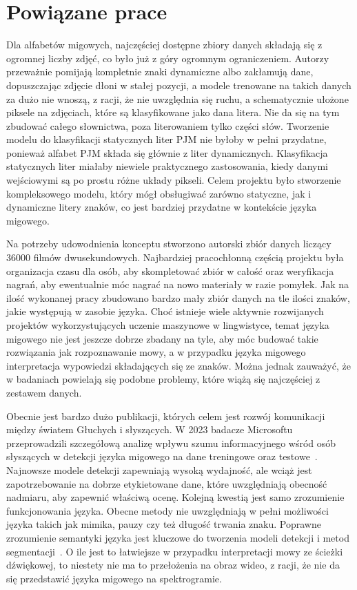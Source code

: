 \section{Powiązane prace}
\label{sec:related-works}

Dla alfabetów migowych, najczęściej dostępne zbiory danych składają się z ogromnej liczby zdjęć, co było już z góry ogromnym ograniczeniem. Autorzy przeważnie pomijają kompletnie znaki dynamiczne albo zakłamują dane, dopuszczając zdjęcie dłoni w stałej pozycji, a modele trenowane na takich danych za dużo nie wnoszą, z racji, że nie uwzględnia się ruchu, a schematycznie ułożone piksele na zdjęciach, które są klasyfikowane jako dana litera. Nie da się na tym zbudować całego słownictwa, poza literowaniem tylko części słów. Tworzenie modelu do klasyfikacji statycznych liter PJM nie byłoby w pełni przydatne, ponieważ alfabet PJM składa się głównie z liter dynamicznych. Klasyfikacja statycznych liter miałaby niewiele praktycznego zastosowania, kiedy danymi wejściowymi są po prostu różne układy pikseli. Celem projektu było stworzenie kompleksowego modelu, który mógł obsługiwać zarówno statyczne, jak i dynamiczne litery znaków, co jest bardziej przydatne w kontekście języka migowego.

Na potrzeby udowodnienia konceptu stworzono autorski zbiór danych liczący 36000 filmów dwusekundowych. Najbardziej pracochłonną częścią projektu była organizacja czasu dla osób, aby skompletować zbiór w całość oraz weryfikacja nagrań, aby ewentualnie móc nagrać na nowo materiały w razie pomyłek. Jak na ilość wykonanej pracy zbudowano bardzo mały zbiór danych na tle ilości znaków, jakie występują w zasobie języka. Choć istnieje wiele aktywnie rozwijanych projektów wykorzystujących uczenie maszynowe w lingwistyce, temat języka migowego nie jest jeszcze dobrze zbadany na tyle, aby móc budować takie rozwiązania jak rozpoznawanie mowy, a w przypadku języka migowego interpretacja wypowiedzi składających się ze znaków. Można jednak zauważyć, że w badaniach powielają się podobne problemy, które wiążą się najczęściej z zestawem danych.

Obecnie jest bardzo dużo publikacji, których celem jest rozwój komunikacji między światem Głuchych i słyszących. W 2023 badacze Microsoftu przeprowadzili szczegółową analizę wpływu szumu informacyjnego wśród osób słyszących w detekcji języka migowego na dane treningowe oraz testowe~\cite{pal2023}. Najnowsze modele detekcji zapewniają wysoką wydajność, ale wciąż jest zapotrzebowanie na dobrze etykietowane dane, które uwzględniają obecność nadmiaru, aby zapewnić właściwą ocenę. Kolejną kwestią jest samo zrozumienie funkcjonowania języka. Obecne metody nie uwzględniają w pełni możliwości języka takich jak mimika, pauzy czy też długość trwania znaku. Poprawne zrozumienie semantyki języka jest kluczowe do tworzenia modeli detekcji i metod segmentacji~\cite{deSisto2021}. O ile jest to łatwiejsze w przypadku interpretacji mowy ze ścieżki dźwiękowej, to niestety nie ma to przełożenia na obraz wideo, z racji, że nie da się przedstawić języka migowego na spektrogramie.

